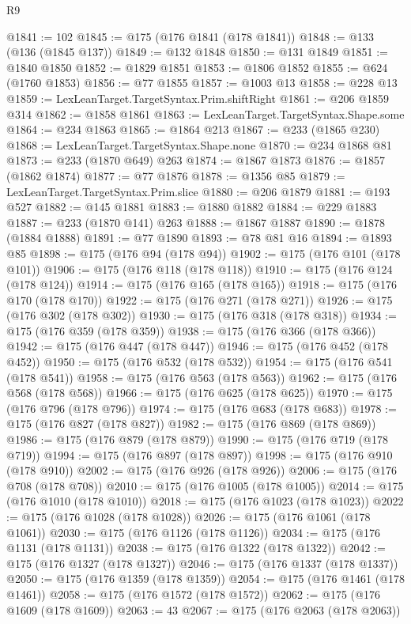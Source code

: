 \begin{lexlean}{R9}
\begin{coremodule}
@1841 := 102
@1845 := @175 (@176 @1841 (@178 @1841))
@1848 := @133 (@136 (@1845 @137))
@1849 := @132 @1848
@1850 := @131 @1849
@1851 := @1840 @1850
@1852 := @1829 @1851
@1853 := @1806 @1852
@1855 := @624 (@1760 @1853)
@1856 := @77 @1855
@1857 := @1003 @13
@1858 := @228 @13
@1859 := LexLeanTarget.TargetSyntax.Prim.shiftRight
@1861 := @206 @1859 @314
@1862 := @1858 @1861
@1863 := LexLeanTarget.TargetSyntax.Shape.some
@1864 := @234 @1863
@1865 := @1864 @213
@1867 := @233 (@1865 @230)
@1868 := LexLeanTarget.TargetSyntax.Shape.none
@1870 := @234 @1868 @81
@1873 := @233 (@1870 @649) @263
@1874 := @1867 @1873
@1876 := @1857 (@1862 @1874)
@1877 := @77 @1876
@1878 := @1356 @85
@1879 := LexLeanTarget.TargetSyntax.Prim.slice
@1880 := @206 @1879
@1881 := @193 @527
@1882 := @145 @1881
@1883 := @1880 @1882
@1884 := @229 @1883
@1887 := @233 (@1870 @141) @263
@1888 := @1867 @1887
@1890 := @1878 (@1884 @1888)
@1891 := @77 @1890
@1893 := @78 @81 @16
@1894 := @1893 @85
@1898 := @175 (@176 @94 (@178 @94))
@1902 := @175 (@176 @101 (@178 @101))
@1906 := @175 (@176 @118 (@178 @118))
@1910 := @175 (@176 @124 (@178 @124))
@1914 := @175 (@176 @165 (@178 @165))
@1918 := @175 (@176 @170 (@178 @170))
@1922 := @175 (@176 @271 (@178 @271))
@1926 := @175 (@176 @302 (@178 @302))
@1930 := @175 (@176 @318 (@178 @318))
@1934 := @175 (@176 @359 (@178 @359))
@1938 := @175 (@176 @366 (@178 @366))
@1942 := @175 (@176 @447 (@178 @447))
@1946 := @175 (@176 @452 (@178 @452))
@1950 := @175 (@176 @532 (@178 @532))
@1954 := @175 (@176 @541 (@178 @541))
@1958 := @175 (@176 @563 (@178 @563))
@1962 := @175 (@176 @568 (@178 @568))
@1966 := @175 (@176 @625 (@178 @625))
@1970 := @175 (@176 @796 (@178 @796))
@1974 := @175 (@176 @683 (@178 @683))
@1978 := @175 (@176 @827 (@178 @827))
@1982 := @175 (@176 @869 (@178 @869))
@1986 := @175 (@176 @879 (@178 @879))
@1990 := @175 (@176 @719 (@178 @719))
@1994 := @175 (@176 @897 (@178 @897))
@1998 := @175 (@176 @910 (@178 @910))
@2002 := @175 (@176 @926 (@178 @926))
@2006 := @175 (@176 @708 (@178 @708))
@2010 := @175 (@176 @1005 (@178 @1005))
@2014 := @175 (@176 @1010 (@178 @1010))
@2018 := @175 (@176 @1023 (@178 @1023))
@2022 := @175 (@176 @1028 (@178 @1028))
@2026 := @175 (@176 @1061 (@178 @1061))
@2030 := @175 (@176 @1126 (@178 @1126))
@2034 := @175 (@176 @1131 (@178 @1131))
@2038 := @175 (@176 @1322 (@178 @1322))
@2042 := @175 (@176 @1327 (@178 @1327))
@2046 := @175 (@176 @1337 (@178 @1337))
@2050 := @175 (@176 @1359 (@178 @1359))
@2054 := @175 (@176 @1461 (@178 @1461))
@2058 := @175 (@176 @1572 (@178 @1572))
@2062 := @175 (@176 @1609 (@178 @1609))
@2063 := 43
@2067 := @175 (@176 @2063 (@178 @2063))

\end{coremodule}
\end{lexlean}
